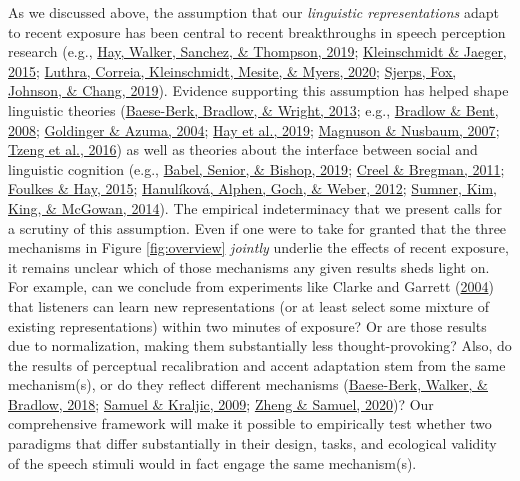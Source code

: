 \documentclass[
  11pt,
  man,floatsintext]{apa6}
\begin{document}
As we discussed above, the assumption that our \emph{linguistic representations} adapt to recent exposure has been central to recent breakthroughs in speech perception research (e.g., \protect\hyperlink{ref-hay2019}{Hay, Walker, Sanchez, \& Thompson, 2019}; \protect\hyperlink{ref-kleinschmidt-jaeger2015}{Kleinschmidt \& Jaeger, 2015}; \protect\hyperlink{ref-luthra2020a}{Luthra, Correia, Kleinschmidt, Mesite, \& Myers, 2020}; \protect\hyperlink{ref-sjerps2019}{Sjerps, Fox, Johnson, \& Chang, 2019}). Evidence supporting this assumption has helped shape linguistic theories (\protect\hyperlink{ref-baeseberk2013}{Baese-Berk, Bradlow, \& Wright, 2013}; e.g., \protect\hyperlink{ref-bradlow-bent2008}{Bradlow \& Bent, 2008}; \protect\hyperlink{ref-goldinger-azuma2004}{Goldinger \& Azuma, 2004}; \protect\hyperlink{ref-hay2019}{Hay et al., 2019}; \protect\hyperlink{ref-magnuson-nusbaum2007}{Magnuson \& Nusbaum, 2007}; \protect\hyperlink{ref-tzeng2016}{Tzeng et al., 2016}) as well as theories about the interface between social and linguistic cognition (e.g., \protect\hyperlink{ref-babel2019}{Babel, Senior, \& Bishop, 2019}; \protect\hyperlink{ref-creel-bregman2011}{Creel \& Bregman, 2011}; \protect\hyperlink{ref-foulkes-hay2015}{Foulkes \& Hay, 2015}; \protect\hyperlink{ref-hanulikova2012}{Hanulíková, Alphen, Goch, \& Weber, 2012}; \protect\hyperlink{ref-sumner2014}{Sumner, Kim, King, \& McGowan, 2014}). The empirical indeterminacy that we present calls for a scrutiny of this assumption. Even if one were to take for granted that the three mechanisms in Figure \ref{fig:overview} \emph{jointly} underlie the effects of recent exposure, it remains unclear which of those mechanisms any given results sheds light on. For example, can we conclude from experiments like Clarke and Garrett (\protect\hyperlink{ref-clarke-garrett2004}{2004}) that listeners can learn new representations (or at least select some mixture of existing representations) within two minutes of exposure? Or are those results due to normalization, making them substantially less thought-provoking? Also, do the results of perceptual recalibration and accent adaptation stem from the same mechanism(s), or do they reflect different mechanisms (\protect\hyperlink{ref-baeseberk2018}{Baese-Berk, Walker, \& Bradlow, 2018}; \protect\hyperlink{ref-samuel-kraljic2009}{Samuel \& Kraljic, 2009}; \protect\hyperlink{ref-zheng-samuel2020}{Zheng \& Samuel, 2020})? Our comprehensive framework will make it possible to empirically test whether two paradigms that differ substantially in their design, tasks, and ecological validity of the speech stimuli would in fact engage the same mechanism(s).
\end{document}
